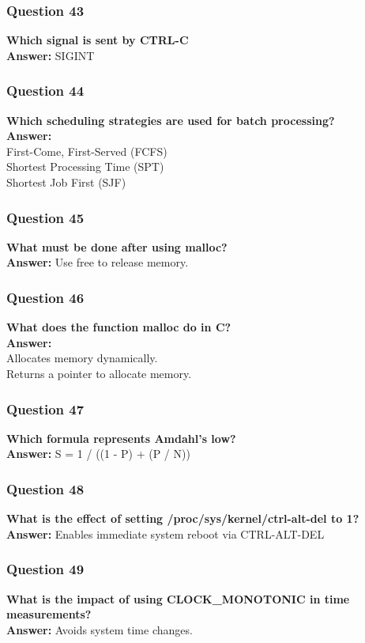 \documentclass{article}
\begin{document}
\subsubsection*{Question 43}
\textbf{Which signal is sent by CTRL-C} \\
\textbf{Answer:} SIGINT

\subsubsection*{Question 44}
\textbf{Which scheduling strategies are used for batch processing?} \\
\textbf{Answer:} \\
First-Come, First-Served (FCFS) \\
Shortest Processing Time (SPT) \\
Shortest Job First (SJF)

\subsubsection*{Question 45}
\textbf{What must be done after using malloc?} \\
\textbf{Answer:} Use free to release memory.

\subsubsection*{Question 46}
\textbf{What does the function malloc do in C?} \\
\textbf{Answer:} \\
Allocates memory dynamically. \\
Returns a pointer to allocate memory.

\subsubsection*{Question 47}
\textbf{Which formula represents Amdahl's low?} \\
\textbf{Answer:} S = 1 / ((1 - P) + (P / N))

\subsubsection*{Question 48}
\textbf{What is the effect of setting /proc/sys/kernel/ctrl-alt-del to 1?} \\
\textbf{Answer:} Enables immediate system reboot via CTRL-ALT-DEL

\subsubsection*{Question 49}
\textbf{What is the impact of using CLOCK\_MONOTONIC in time measurements?} \\
\textbf{Answer:} Avoids system time changes.
\end{document}
